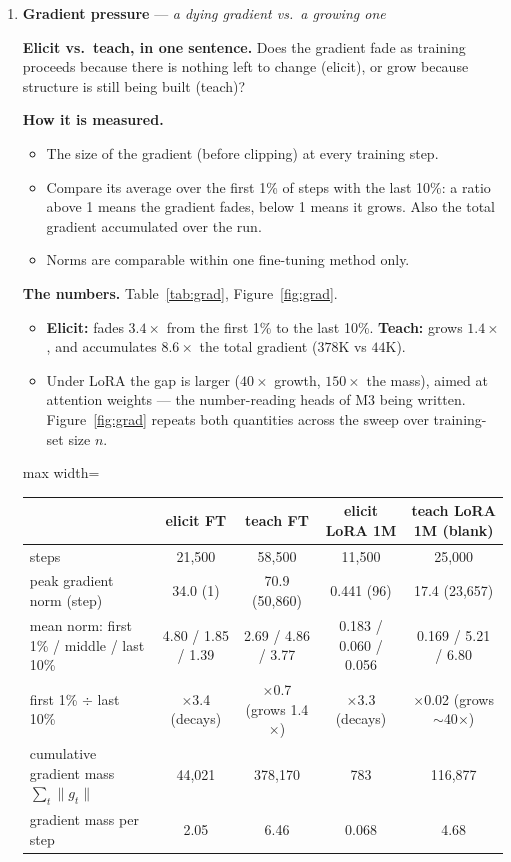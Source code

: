 \documentclass[11pt]{article}
\newcommand{\what}[1]{\par\noindent\textbf{Elicit vs.\ teach, in one sentence.} #1}
\newcommand{\how}[1]{\par\noindent\textbf{How it is measured.} #1}
\newcommand{\numbers}[1]{\par\noindent\textbf{The numbers.} #1\par\medskip}
\newenvironment{steps}{\begin{itemize}[nosep,leftmargin=1.2em,topsep=2pt]}{\end{itemize}}
\newcommand{\metricsec}[2]{\item \textbf{#1} --- \emph{#2}}
\begin{document}
\begin{enumerate}[label=\textbf{M\arabic*}, leftmargin=*, itemsep=1.2em, resume]
\metricsec{Gradient pressure}{a dying gradient vs.\ a growing one}
\what{Does the gradient fade as training proceeds because there is nothing left to change
(elicit), or grow because structure is still being built (teach)?}
\how{
\begin{steps}
\item The size of the gradient (before clipping) at every training step.
\item Compare its average over the first 1\% of steps with the last 10\%: a ratio above 1 means
the gradient fades, below 1 means it grows. Also the total gradient accumulated over the run.
\item Norms are comparable within one fine-tuning method only.
\end{steps}}
\numbers{Table~\ref{tab:grad}, Figure~\ref{fig:grad}.
\begin{steps}
\item \textbf{Elicit:} fades $3.4\times$ from the first 1\% to the last 10\%. \textbf{Teach:}
grows $1.4\times$, and accumulates $8.6\times$ the total gradient ($378$K vs $44$K).
\item Under LoRA the gap is larger ($40\times$ growth, $150\times$ the mass), aimed at attention
weights --- the number-reading heads of M3 being written. Figure~\ref{fig:grad} repeats both
quantities across the sweep over training-set size $n$.
\end{steps}}
\begin{table}[h]\centering\small
\begin{adjustbox}{max width=\textwidth}
\begin{tabular}{lcccc}
\toprule
 & \textbf{elicit FT} & \textbf{teach FT} & elicit LoRA 1M & teach LoRA 1M (blank) \\
\midrule
steps & 21{,}500 & 58{,}500 & 11{,}500 & 25{,}000 \\
peak gradient norm (step) & 34.0 (1) & 70.9 (50{,}860) & 0.441 (96) & 17.4 (23{,}657) \\
mean norm: first 1\% / middle / last 10\% & 4.80 / 1.85 / 1.39 & 2.69 / 4.86 / 3.77 & 0.183 / 0.060 / 0.056 & 0.169 / 5.21 / 6.80 \\
first 1\% $\div$ last 10\% & $\times$3.4 (decays) & $\times$0.7 (grows 1.4$\times$) & $\times$3.3 (decays) & $\times$0.02 (grows $\sim$40$\times$) \\
cumulative gradient mass $\sum_t\|g_t\|$ & 44{,}021 & 378{,}170 & 783 & 116{,}877 \\
gradient mass per step & 2.05 & 6.46 & 0.068 & 4.68 \\

\end{tabular}
\end{adjustbox}
\end{table}
\end{enumerate}
\end{document}
